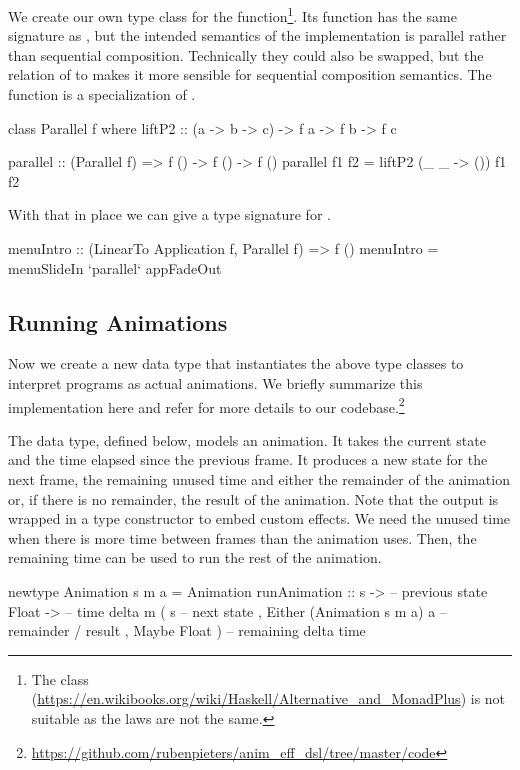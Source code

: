 We create our own  type class for the  function\footnote{The  class (\url{https://en.wikibooks.org/wiki/Haskell/Alternative_and_MonadPlus}) is not suitable as the laws are not the same.}. Its  function has the same signature as , but the intended semantics of the  implementation is parallel rather than sequential composition. Technically they could also be swapped, but the relation of  to  makes it more sensible for sequential composition semantics. The  function is a specialization of .

\begin{code}
class Parallel f where
  liftP2 :: (a -> b -> c) -> f a -> f b -> f c

parallel :: (Parallel f) => f () -> f () -> f ()
parallel f1 f2 = liftP2 (\_ _ -> ()) f1 f2
\end{code}
With that in place we can give a type signature for .
\begin{code}
menuIntro :: (LinearTo Application f, Parallel f) => f ()
menuIntro = menuSlideIn `parallel` appFadeOut
\end{code}

\subsection{Running Animations}

Now we create a new  data type that instantiates the above
type classes to interpret \dsl{} programs as actual animations. We briefly
summarize this implementation here and refer for more details to
our codebase.\footnote{\url{https://github.com/rubenpieters/anim_eff_dsl/tree/master/code}}

The  data type, defined below, models an animation.
It takes the current state  and the
time elapsed since the previous frame. It produces a new
state for the next frame, the remaining unused time and either the remainder of the animation or, if there is no remainder, the result of the animation. Note that the output is wrapped in a type
constructor  to embed custom effects. 
We need the unused time when there is more time between frames than the animation
uses.
Then, the remaining time
can be used to run the rest of the animation.

\begin{code}
newtype Animation s m a = Animation { runAnimation ::
    s ->                             -- previous state
    Float ->                         -- time delta
    m ( s                            -- next state
      , Either (Animation s m a) a   -- remainder / result
      , Maybe Float )}               -- remaining delta time
\end{code}

